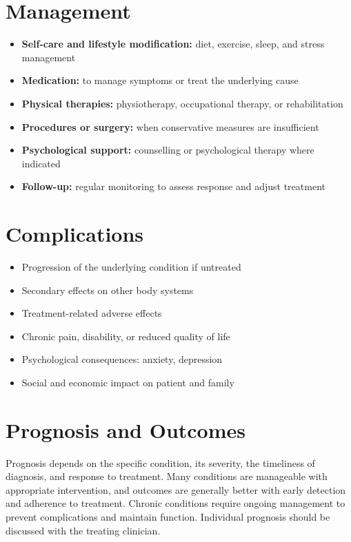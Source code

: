 \section*{Management}
\begin{itemize}
    \item \textbf{Self-care and lifestyle modification:} diet, exercise, sleep, and stress management
    \item \textbf{Medication:} to manage symptoms or treat the underlying cause
    \item \textbf{Physical therapies:} physiotherapy, occupational therapy, or rehabilitation
    \item \textbf{Procedures or surgery:} when conservative measures are insufficient
    \item \textbf{Psychological support:} counselling or psychological therapy where indicated
    \item \textbf{Follow-up:} regular monitoring to assess response and adjust treatment
\end{itemize}

\section*{Complications}
\begin{itemize}
    \item Progression of the underlying condition if untreated
    \item Secondary effects on other body systems
    \item Treatment-related adverse effects
    \item Chronic pain, disability, or reduced quality of life
    \item Psychological consequences: anxiety, depression
    \item Social and economic impact on patient and family
\end{itemize}

\section*{Prognosis and Outcomes}
Prognosis depends on the specific condition, its severity, the timeliness of diagnosis, and response to treatment. Many conditions are manageable with appropriate intervention, and outcomes are generally better with early detection and adherence to treatment. Chronic conditions require ongoing management to prevent complications and maintain function. Individual prognosis should be discussed with the treating clinician.

